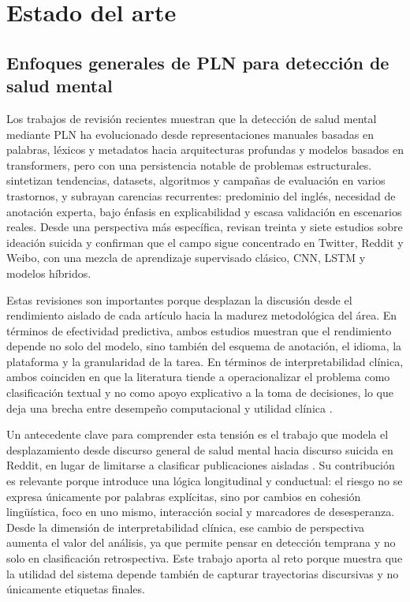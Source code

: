 \section{Estado del arte}

\subsection{Enfoques generales de PLN para detección de salud mental}

Los trabajos de revisión recientes muestran que la detección de salud mental mediante PLN ha evolucionado desde representaciones manuales basadas en palabras, léxicos y metadatos hacia arquitecturas profundas y modelos basados en transformers, pero con una persistencia notable de problemas estructurales. \citet{montejo2024survey} sintetizan tendencias, datasets, algoritmos y campañas de evaluación en varios trastornos, y subrayan carencias recurrentes: predominio del inglés, necesidad de anotación experta, bajo énfasis en explicabilidad y escasa validación en escenarios reales. Desde una perspectiva más específica, \citet{abdulsalam2024suicidal} revisan treinta y siete estudios sobre ideación suicida y confirman que el campo sigue concentrado en Twitter, Reddit y Weibo, con una mezcla de aprendizaje supervisado clásico, CNN, LSTM y modelos híbridos.

Estas revisiones son importantes porque desplazan la discusión desde el rendimiento aislado de cada artículo hacia la madurez metodológica del área. En términos de efectividad predictiva, ambos estudios muestran que el rendimiento depende no solo del modelo, sino también del esquema de anotación, el idioma, la plataforma y la granularidad de la tarea. En términos de interpretabilidad clínica, ambos coinciden en que la literatura tiende a operacionalizar el problema como clasificación textual y no como apoyo explicativo a la toma de decisiones, lo que deja una brecha entre desempeño computacional y utilidad clínica \citep{montejo2024survey, abdulsalam2024suicidal}.

Un antecedente clave para comprender esta tensión es el trabajo que modela el desplazamiento desde discurso general de salud mental hacia discurso suicida en Reddit, en lugar de limitarse a clasificar publicaciones aisladas \citep{dechoudhury2016shifts}. Su contribución es relevante porque introduce una lógica longitudinal y conductual: el riesgo no se expresa únicamente por palabras explícitas, sino por cambios en cohesión lingüística, foco en uno mismo, interacción social y marcadores de desesperanza. Desde la dimensión de interpretabilidad clínica, ese cambio de perspectiva aumenta el valor del análisis, ya que permite pensar en detección temprana y no solo en clasificación retrospectiva. Este trabajo aporta al reto porque muestra que la utilidad del sistema depende también de capturar trayectorias discursivas y no únicamente etiquetas finales.

